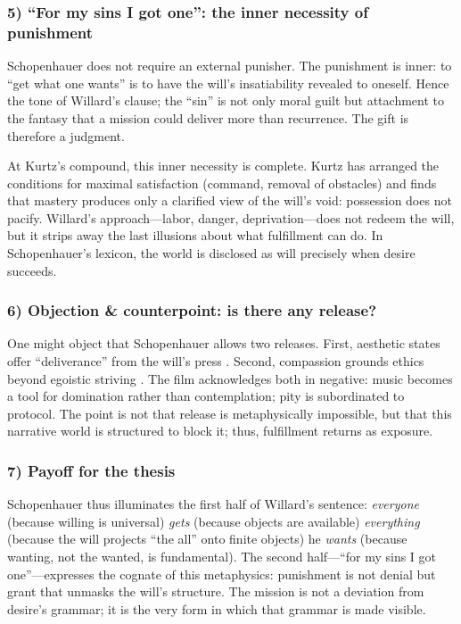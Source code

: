 \subsubsection*{5) ``For my sins I got one'': the inner necessity of punishment}

Schopenhauer does not require an external punisher. The punishment is inner: to ``get what one
wants'' is to have the will's insatiability revealed to oneself. Hence the tone of Willard's
clause; the ``sin'' is not only moral guilt but attachment to the fantasy that a mission could
deliver more than recurrence. The gift is therefore a judgment.

At Kurtz's compound, this inner necessity is complete. Kurtz has arranged the conditions for
maximal satisfaction (command, removal of obstacles) and finds that mastery produces only a
clarified view of the will's void: possession does not pacify. Willard's approach—labor, danger,
deprivation—does not redeem the will, but it strips away the last illusions about what
fulfillment can do. In Schopenhauer's lexicon, the world is disclosed as will precisely when
desire succeeds.

\subsubsection*{6) Objection \& counterpoint: is there any release?}

One might object that Schopenhauer allows two releases. First, aesthetic states offer
``deliverance'' from the will's press \parencite[p.~178]{SchopenhauerWWR1969}. Second,
compassion grounds ethics beyond egoistic striving \parencite[pp.~372--374]{SchopenhauerWWR1969}.
The film acknowledges both in negative: music becomes a tool for domination rather than
contemplation; pity is subordinated to protocol. The point is not that release is metaphysically
impossible, but that this narrative world is structured to block it; thus, fulfillment returns
as exposure.

\subsubsection*{7) Payoff for the thesis}

Schopenhauer thus illuminates the first half of Willard's sentence: \emph{everyone} (because
willing is universal) \emph{gets} (because objects are available) \emph{everything} (because
the will projects ``the all'' onto finite objects) he \emph{wants} (because wanting, not the
wanted, is fundamental). The second half—``for my sins I got one''—expresses the cognate of this
metaphysics: punishment is not denial but grant that unmasks the will's structure. The mission
is not a deviation from desire's grammar; it is the very form in which that grammar is made
visible.
